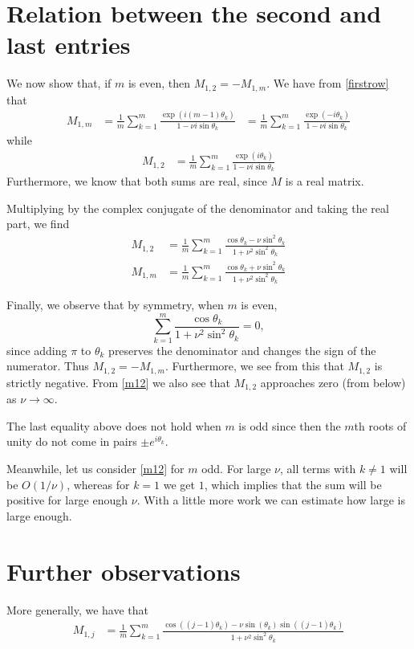 \documentclass[a4paper]{article}
\begin{document}
\section{Relation between the second and last entries}
We now show that, if $m$ is even, then $M_{1,2} = -M_{1,m}$.
We have from \eqref{firstrow} that
\begin{align*} 
    M_{1,m} & = \frac{1}{m} \sum_{k=1}^m \frac{ \exp(i(m-1)\theta_k)}{1-\nu i \sin\theta_k}
            & = \frac{1}{m} \sum_{k=1}^m \frac{ \exp(-i\theta_k)}{1-\nu i \sin\theta_k}
\end{align*}
while
\begin{align*} 
    M_{1,2} & = \frac{1}{m} \sum_{k=1}^m \frac{ \exp(i\theta_k)}{1-\nu i \sin\theta_k}
\end{align*}
Furthermore, we know that both sums are real, since $M$ is a real matrix.

Multiplying by the complex conjugate of the denominator and taking
the real part, we find
\begin{subequations}
\begin{align}
    M_{1,2} & = \frac{1}{m} \sum_{k=1}^m \frac{\cos \theta_k - \nu \sin^2 \theta_k}{1+\nu^2 \sin^2 \theta_k} \label{m12} \\
    M_{1,m} & = \frac{1}{m} \sum_{k=1}^m \frac{\cos \theta_k + \nu \sin^2 \theta_k}{1+\nu^2 \sin^2 \theta_k}
\end{align}
\end{subequations}

Finally, we observe that by symmetry, when $m$ is even,
$$ \sum_{k=1}^m \frac{\cos \theta_k}{1+\nu^2\sin^2\theta_k} = 0,$$
since adding $\pi$ to $\theta_k$ preserves the denominator and changes the sign of the numerator.
Thus $M_{1,2} = -M_{1,m}$.  
Furthermore, we see from this that  $M_{1,2}$ is strictly negative.
From \eqref{m12} we also see that $M_{1,2}$ approaches zero
(from below) as $\nu \to \infty$.

The last equality above does not hold when $m$ is odd since then
the $m$th roots of unity do not come in  pairs $\pm e^{i\theta_k}$.

Meanwhile, let us consider \eqref{m12} for $m$ odd.  For large $\nu$,
all terms with $k\ne 1$ will be $O(1/\nu)$, whereas for $k=1$ we get $1$,
which implies that the sum will be positive for large enough $\nu$.  With a
little more work we can estimate how large is large enough.

\section{Further observations}
More generally, we have that
\begin{align*}
    M_{1,j} & = \frac{1}{m} \sum_{k=1}^m \frac{\cos ((j-1)\theta_k) - \nu \sin( \theta_k) \sin((j-1)\theta_k)}{1+\nu^2 \sin^2 \theta_k} \\
\end{align*}
\end{document}
